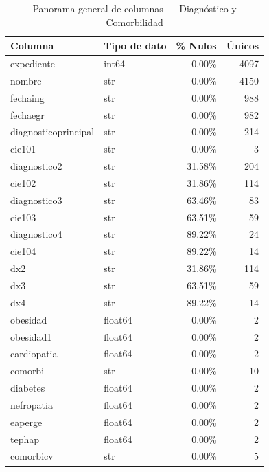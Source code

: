 \begin{table}[H]
\centering
\small
\caption{Panorama general de columnas — Diagnóstico y Comorbilidad}
\label{tab:panorama_comorbilidad_tesis}
\begin{tabular}{lp{3cm}rr}
\toprule
\textbf{Columna} & \textbf{Tipo de dato} & \textbf{\% Nulos} & \textbf{Únicos} \\
\midrule
expediente            & int64   & 0.00\% & 4097 \\
nombre                & str     & 0.00\% & 4150 \\
fechaing              & str     & 0.00\% & 988  \\
fechaegr              & str     & 0.00\% & 982  \\
diagnosticoprincipal  & str     & 0.00\% & 214  \\
cie101                & str     & 0.00\% & 3    \\
diagnostico2          & str     & 31.58\% & 204 \\
cie102                & str     & 31.86\% & 114 \\
diagnostico3          & str     & 63.46\% & 83   \\
cie103                & str     & 63.51\% & 59   \\
diagnostico4          & str     & 89.22\% & 24   \\
cie104                & str     & 89.22\% & 14   \\
dx2                   & str     & 31.86\% & 114 \\
dx3                   & str     & 63.51\% & 59   \\
dx4                   & str     & 89.22\% & 14   \\
obesidad              & float64 & 0.00\% & 2    \\
obesidad1             & float64 & 0.00\% & 2    \\
cardiopatia           & float64 & 0.00\% & 2    \\
comorbi               & str     & 0.00\% & 10   \\
diabetes              & float64 & 0.00\% & 2    \\
nefropatia            & float64 & 0.00\% & 2    \\
eaperge               & float64 & 0.00\% & 2    \\
tephap                & float64 & 0.00\% & 2    \\
comorbicv             & str     & 0.00\% & 5    \\
\bottomrule
\end{tabular}
\end{table}


